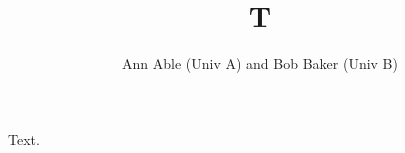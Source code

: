 \documentclass{article}
\begin{document}
\title{T}
\author{Ann Able (Univ A) and Bob Baker (Univ B)}
\maketitle
Text.
\end{document}
